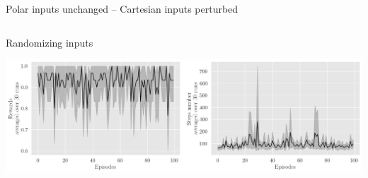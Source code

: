 \documentclass[bigger]{beamer}
\begin{document}
\begin{frame}[label={sec:org29a5971}]{Polar inputs unchanged -- Cartesian inputs perturbed}
\begin{columns}
\begin{column}[c]{0.5\columnwidth}
\begin{center}
\end{center}
\begin{center}
\footnotesize
Randomizing inputs
\end{center}
\begin{center}
\includegraphics[width=\textwidth]{medias/LeftRight/exp_keep-polar_silence-False.png}
\end{center}
\end{column}
\end{columns}
\end{frame}
\end{document}
